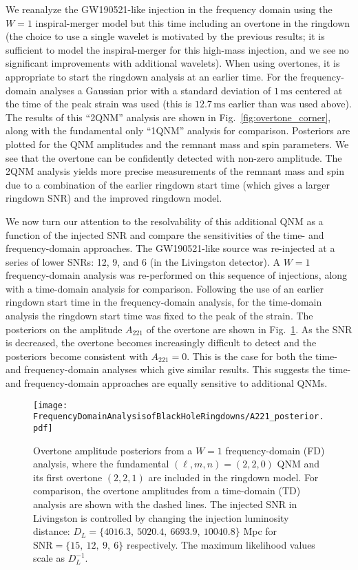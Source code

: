 We reanalyze the GW190521-like injection in the frequency domain using the $W=1$ inspiral-merger model but this time including an overtone in the ringdown (the choice to use a single wavelet is motivated by the previous results; it is sufficient to model the inspiral-merger for this high-mass injection, and we see no significant improvements with additional wavelets).
When using overtones, it is appropriate to start the ringdown analysis at an earlier time. 
For the frequency-domain analyses a Gaussian prior with a standard deviation of $1\,\mathrm{ms}$ centered at the time of the peak strain was used (this is $12.7\,\mathrm{ms}$ earlier than was used above).
The results of this ``2QNM'' analysis are shown in Fig.~\ref{fig:overtone_corner}, along with the fundamental only ``1QNM'' analysis for comparison.
Posteriors are plotted for the QNM amplitudes and the remnant mass and spin parameters. 
We see that the overtone can be confidently detected with non-zero amplitude.
The 2QNM analysis yields more precise measurements of the remnant mass and spin due to a combination of the earlier ringdown start time (which gives a larger ringdown SNR) and the improved ringdown model.

We now turn our attention to the resolvability of this additional QNM as a function of the injected SNR and compare the sensitivities of the time- and frequency-domain approaches.
The GW190521-like source was re-injected at a series of lower SNRs: 12, 9, and 6 (in the Livingston detector).
A $W=1$ frequency-domain analysis was re-performed on this sequence of injections, along with a time-domain analysis for comparison. 
Following the use of an earlier ringdown start time in the frequency-domain analysis, for the time-domain analysis the ringdown start time was fixed to the peak of the strain.
The posteriors on the amplitude $A_{221}$ of the overtone are shown in Fig.~\ref{fig:A221_posterior}.
As the SNR is decreased, the overtone becomes increasingly difficult to detect and the posteriors become consistent with $A_{221}=0$.
This is the case for both the time- and frequency-domain analyses which give similar results.
This suggests the time- and frequency-domain approaches are equally sensitive to additional QNMs.

\begin{figure}[t]
	\centering
	\texttt{[image: FrequencyDomainAnalysisofBlackHoleRingdowns/A221\_posterior.pdf]}
	\caption[Overtone amplitude posteriors from a $W=1$ frequency-domain analysis]{ 
		Overtone amplitude posteriors from a $W=1$ frequency-domain (FD) analysis, where the fundamental $(\ell,m,n) = (2,2,0)$ QNM and its first overtone $(2,2,1)$ are included in the ringdown model. For comparison, the overtone amplitudes from a time-domain (TD) analysis are shown with the dashed lines. The injected SNR in Livingston is controlled by changing the injection luminosity distance: $D_L = \{4016.3,\ 5020.4,\ 6693.9,\ 10040.8\}$ Mpc for $\mathrm{SNR} = \{15,\ 12,\ 9,\ 6\}$ respectively. The maximum likelihood values scale as $D_L^{-1}$.
	}
	\label{fig:A221_posterior}
\end{figure}

